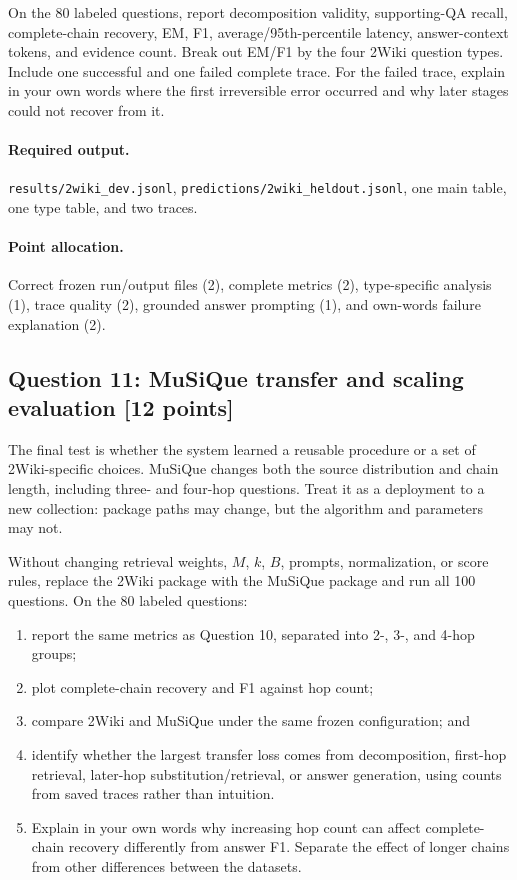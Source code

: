 \documentclass[11pt]{article}
\newcommand{\code}[1]{\texttt{#1}}
\newcommand{\question}[3]{%
  \subsection[Question #1: #2 (#3 points)]{Question #1: #2 \hfill [#3 points]}%
}
\newcommand{\deliverables}{\paragraph{Required output.}}
\newcommand{\grading}{\paragraph{Point allocation.}}
\begin{document}
On the 80 labeled questions, report decomposition validity, supporting-QA
recall, complete-chain recovery, EM, F1, average/95th-percentile latency,
answer-context tokens, and evidence count. Break out EM/F1 by the four 2Wiki
question types. Include one successful and one failed complete trace. For the
failed trace, explain in your own words where the first irreversible error
occurred and why later stages could not recover from it.

\deliverables \code{results/2wiki\_dev.jsonl},
\code{predictions/2wiki\_heldout.jsonl}, one main table, one type table, and two
traces.

\grading Correct frozen run/output files (2), complete metrics (2),
type-specific analysis (1), trace quality (2), grounded answer prompting (1),
and own-words failure explanation (2).

\question{11}{MuSiQue transfer and scaling evaluation}{12}

The final test is whether the system learned a reusable procedure or a set of
2Wiki-specific choices. MuSiQue changes both the source distribution and chain
length, including three- and four-hop questions. Treat it as a deployment to a
new collection: package paths may change, but the algorithm and parameters may
not.

Without changing retrieval weights, $M$, $k$, $B$, prompts, normalization, or
score rules, replace the 2Wiki package with the MuSiQue package and run all 100
questions. On the 80 labeled questions:

\begin{enumerate}[label=(\alph*)]
  \item report the same metrics as Question 10, separated into 2-, 3-, and
        4-hop groups;
  \item plot complete-chain recovery and F1 against hop count;
  \item compare 2Wiki and MuSiQue under the same frozen configuration; and
  \item identify whether the largest transfer loss comes from decomposition,
        first-hop retrieval, later-hop substitution/retrieval, or answer
        generation, using counts from saved traces rather than intuition.
  \item Explain in your own words why increasing hop count can affect
        complete-chain recovery differently from answer F1. Separate the
        effect of longer chains from other differences between the datasets.
\end{enumerate}
\end{document}

